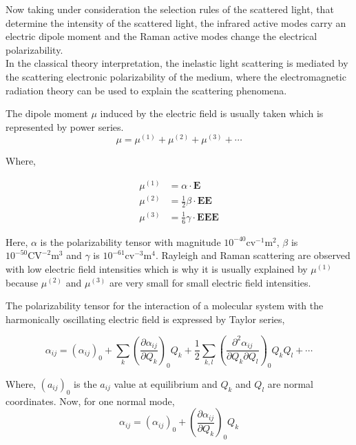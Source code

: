\documentclass[openany,11pt,a4paper]{report}
\begin{document}
Now taking under consideration the selection rules of the scattered light, that determine the intensity of the scattered light, the infrared active modes carry an electric dipole moment and the Raman active modes change the electrical polarizability.\\

In the classical theory interpretation, the inelastic light scattering is mediated by the scattering electronic polarizability of the medium, where the electromagnetic radiation theory can be used to explain the scattering phenomena. 

The dipole moment $\mu$ induced by the electric field is usually taken which is represented by power series. 
\begin{equation}
\mu=\mu^{(1)}+\mu^{(2)}+\mu^{(3)}+\cdots
\end{equation}

Where,

\begin{equation}
\begin{aligned} \mu^{(1)} &=\alpha \cdot \mathbf{E} \\ \mu^{(2)} &=\frac{1}{2} \beta \cdot \mathbf{E} \mathbf{E} \\ \mu^{(3)} &=\frac{1}{6} \gamma \cdot \mathbf{E} \mathbf{E} \mathbf{E} \end{aligned}
\end{equation}

Here, $\alpha$ is the polarizability tensor with magnitude 
$10^{-40} \mathrm{cv}^{-1} \mathrm{m}^{2}$, $\beta$ is $10^{-50} \mathrm{CV}^{-2} \mathrm{m}^{3}$ and $\gamma$ is $10^{-61} \mathrm{cv}^{-3} \mathrm{m}^{4}$. Rayleigh and Raman scattering are observed with low electric field intensities which is why it is usually explained by $\mu^{(1)}$ because $\mu^{(2)}$ and $\mu^{(3)}$ are very small for small electric field intensities.

The polarizability tensor for the interaction of a molecular system with the harmonically oscillating electric field is expressed by Taylor series,

\begin{equation}
\alpha_{i j}=\left(\alpha_{i j}\right)_{0}+\sum_{k}\left(\frac{\partial \alpha_{i j}}{\partial Q_{k}}\right)_{0} Q_{k}+\frac{1}{2} \sum_{k, l}\left(\frac{\partial^{2} \alpha_{i j}}{\partial Q_{k} \partial Q_{l}}\right)_{0} Q_{k} Q_{l}+\cdots
\end{equation}

Where, $\left(a_{i j}\right)_{0}$ is the $a_{i j}$ value at equilibrium and $Q_{k}$ and  $Q_{l}$ are normal coordinates. Now, for one normal mode,
\begin{equation}
\alpha_{i j}=\left(\alpha_{i j}\right)_{0}+\left(\frac{\partial \alpha_{i j}}{\partial Q_{k}}\right)_{0} Q_{k}
\end{equation}
\end{document}
